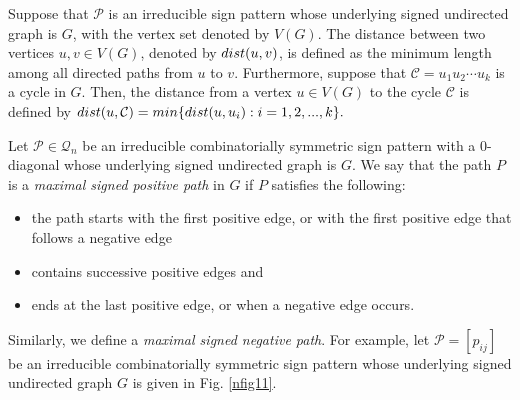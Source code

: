 \documentclass[10pt,a4paper]{amsart}
\numberwithin{equation}{section}
\def\min{{\rm min}}
\def\dist{{\rm dist}}
\begin{document}
	
	
	Suppose that $\mathcal{P} $ is an irreducible sign pattern whose underlying signed undirected graph is $G$, with the vertex set denoted by $V(G)$.
	The distance between two vertices $u,v\in V(G)$, denoted by $\dist(u,v)$, is defined as the minimum length among all directed paths from $u$ to $v$. Furthermore, suppose that $\mathcal{C}=u_1u_2\cdots u_k$ is a cycle in $G$. Then, the distance from a vertex $u\in V(G)$ to the cycle $\mathcal{C}$ is defined by $\dist(u,\mathcal{C})=\min\{\dist(u,u_i): i=1,2,...,k\}.$
	
	
	
	
	
	Let $\mathcal{P} \in \mathcal{Q}_n$ be an irreducible combinatorially symmetric sign pattern with a $0$-diagonal whose underlying signed undirected graph is $G$. We say that the path $P$ is a \textit{maximal signed positive path} in $G$  if $P$ satisfies the following: 
	\begin{itemize}
		\item[i.] the path starts with the first positive edge, 
		or with the first positive edge that follows a negative edge
		\item[ii.] contains successive 
		positive edges and
		\item[iii.] ends at the last positive edge, or when a negative edge occurs. 
	\end{itemize}
	Similarly, we define a \textit{maximal signed negative path}.  
	For example, let $\mathcal{P}=[p_{ij}]$ be an irreducible combinatorially symmetric sign pattern whose underlying signed undirected graph $G$ is given in Fig. \ref{nfig11}. 
	
\end{document}
